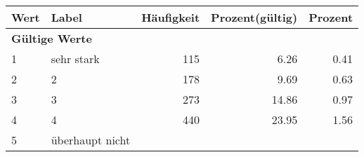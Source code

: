     \begin{longtable}{lXrrr}
     \toprule
     \textbf{Wert} & \textbf{Label} & \textbf{Häufigkeit} & \textbf{Prozent(gültig)} & \textbf{Prozent} \\
     \endhead
     \midrule
     \multicolumn{5}{l}{\textbf{Gültige Werte}}\\

     1 &
     \multicolumn{1}{X}{ sehr stark   } &


       \num{115} &
       \num[round-mode=places,round-precision=2]{6,26} &
         \num[round-mode=places,round-precision=2]{0,41} \\

     2 &
     \multicolumn{1}{X}{ 2   } &


       \num{178} &
       \num[round-mode=places,round-precision=2]{9,69} &
         \num[round-mode=places,round-precision=2]{0,63} \\

     3 &
     \multicolumn{1}{X}{ 3   } &


       \num{273} &
       \num[round-mode=places,round-precision=2]{14,86} &
         \num[round-mode=places,round-precision=2]{0,97} \\

     4 &
     \multicolumn{1}{X}{ 4   } &


       \num{440} &
       \num[round-mode=places,round-precision=2]{23,95} &
         \num[round-mode=places,round-precision=2]{1,56} \\

     5 &
     \multicolumn{1}{X}{ überhaupt nicht   } &



\end{longtable}
